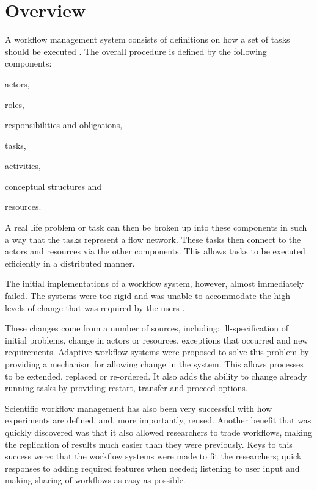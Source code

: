 \section{Overview}
A workflow management system consists of definitions on how a set of tasks
should be executed \cite{springerlink:10.1007/BF00136712,vanderAalst2002125}.
The overall procedure is defined by the following components:
\begin{inparaenum}[(i)] \item actors, \item roles, \item responsibilities and
obligations, \item tasks, \item activities,\item conceptual structures and
\item resources.\end{inparaenum}

A real life problem or task can then be broken up into these components in
such a way that the tasks represent a flow network. These tasks then connect to
the actors and resources via the other
components\cite[p.~4]{Taylor:2006:WES:1196459}.  This allows tasks to be
executed efficiently in a distributed manner.

The initial implementations of a workflow system, however, almost
immediately failed. The systems were too rigid and was unable to accommodate the
high levels of change that was required by the users
\cite{Suchman:1983:OPP:357442.357445}.

These changes come from a number of sources, including: ill-specification
of initial problems, change in actors or resources, exceptions that occurred
and new requirements.  Adaptive workflow systems were proposed to solve this
problem by providing a mechanism for allowing change in the
system\cite{vanderAalst2002125}. This allows processes to be extended, replaced
or re-ordered. It also adds the ability to change already running tasks by
providing restart, transfer and proceed options.

Scientific workflow management has also been very successful with how
experiments are defined, and, more importantly, reused. Another benefit that was
quickly discovered was that it also allowed researchers to trade workflows,
making the replication of results much easier than they were
previously\cite{4721191}. Keys to this success were: that the workflow systems
were made to fit the researchers; quick responses to adding required features
when needed; listening to user input and making sharing of workflows as easy as
possible.

